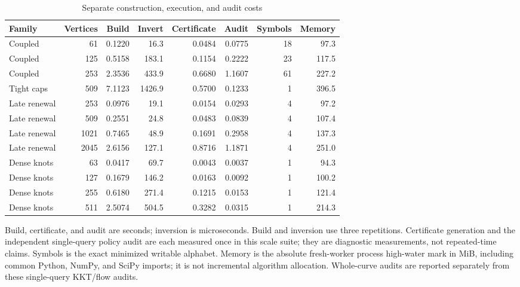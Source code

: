 \begin{table}[htbp]
\centering\small
\caption{Separate construction, execution, and audit costs}\label{tab:phases}
\begin{tabular}{lrrrrrrr}
\toprule
Family & Vertices & Build & Invert & Certificate & Audit & Symbols & Memory \\
\midrule
Coupled & 61 & 0.1220 & 16.3 & 0.0484 & 0.0775 & 18 & 97.3 \\
Coupled & 125 & 0.5158 & 183.1 & 0.1154 & 0.2222 & 23 & 117.5 \\
Coupled & 253 & 2.3536 & 433.9 & 0.6680 & 1.1607 & 61 & 227.2 \\
Tight caps & 509 & 7.1123 & 1426.9 & 0.5700 & 0.1233 & 1 & 396.5 \\
Late renewal & 253 & 0.0976 & 19.1 & 0.0154 & 0.0293 & 4 & 97.2 \\
Late renewal & 509 & 0.2551 & 24.8 & 0.0483 & 0.0839 & 4 & 107.4 \\
Late renewal & 1021 & 0.7465 & 48.9 & 0.1691 & 0.2958 & 4 & 137.3 \\
Late renewal & 2045 & 2.6156 & 127.1 & 0.8716 & 1.1871 & 4 & 251.0 \\
Dense knots & 63 & 0.0417 & 69.7 & 0.0043 & 0.0037 & 1 & 94.3 \\
Dense knots & 127 & 0.1679 & 146.2 & 0.0163 & 0.0092 & 1 & 100.2 \\
Dense knots & 255 & 0.6180 & 271.4 & 0.1215 & 0.0153 & 1 & 121.4 \\
Dense knots & 511 & 2.5074 & 504.5 & 0.3282 & 0.0315 & 1 & 214.3 \\
\bottomrule
\end{tabular}
\par\smallskip\begin{minipage}{\textwidth}\footnotesize Build, certificate, and audit are seconds; inversion is microseconds. Build and inversion use three repetitions. Certificate generation and the independent single-query policy audit are each measured once in this scale suite; they are diagnostic measurements, not repeated-time claims. Symbols is the exact minimized writable alphabet. Memory is the absolute fresh-worker process high-water mark in MiB, including common Python, NumPy, and SciPy imports; it is not incremental algorithm allocation. Whole-curve audits are reported separately from these single-query KKT/flow audits.\end{minipage}
\end{table}
